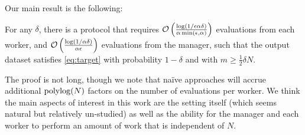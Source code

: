 \documentclass[anon,12pt]{colt2016} %
\newcommand{\goodfrac}{\alpha}
\newcommand{\quality}{\epsilon}
\newcommand{\failprob}{\delta}
\begin{document}
Our main result is the following:
\begin{theorem}
\label{thm:main}
For any $\failprob$, there is a protocol that requires 
$\oo\p{\frac{\log(1/\quality\goodfrac\failprob)}{\goodfrac\min\p{\quality,\goodfrac}}}$ evaluations from each worker, and $\oo\p{\frac{\log(1/\goodfrac\failprob)}{\goodfrac\quality}}$ evaluations from the manager, such that the output dataset 
satisfies \eqref{eq:target} with probability $1-\failprob$ and with $m \geq \frac{1}{2}\delta N$.
\end{theorem}
The proof is not long, though we note that na\"ive approaches will 
accrue additional $\operatorname{polylog}(N)$ factors on the number of evaluations per worker.
We think the main aspects of interest in this work are the setting itself 
(which seems natural but relatively un-studied) as well as the ability for the manager and each worker to perform an amount of work that is independent of $N$.
\end{document}
